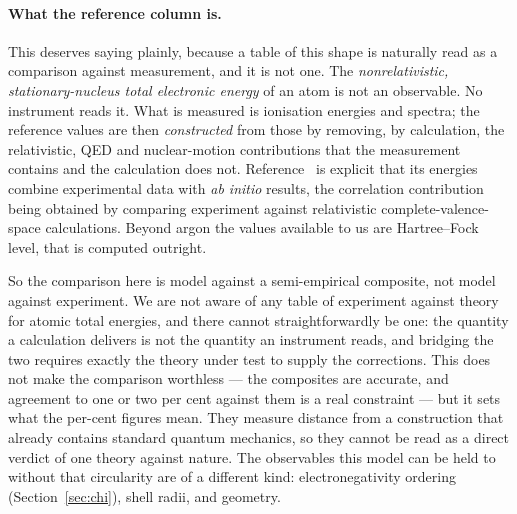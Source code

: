 \documentclass[11pt]{article}
\begin{document}
\paragraph{What the reference column is.} This deserves saying plainly, because a table of this
shape is naturally read as a comparison against measurement, and it is not one. The
\emph{nonrelativistic, stationary-nucleus total electronic energy} of an atom is not an
observable. No instrument reads it. What is measured is ionisation energies and spectra; the
reference values are then \emph{constructed} from those by removing, by calculation, the
relativistic, QED and nuclear-motion contributions that the measurement contains and the
calculation does not. Reference~\cite{Chakravorty} is explicit that its energies combine
experimental data with \emph{ab initio} results, the correlation contribution being obtained by
comparing experiment against relativistic complete-valence-space calculations. Beyond argon the
values available to us are Hartree--Fock level, that is computed outright.

So the comparison here is model against a semi-empirical composite, not model against experiment.
We are not aware of any table of experiment against theory for atomic total energies, and there
cannot straightforwardly be one: the quantity a calculation delivers is not the quantity an
instrument reads, and bridging the two requires exactly the theory under test to supply the
corrections. This does not make the comparison worthless --- the composites are accurate, and
agreement to one or two per cent against them is a real constraint --- but it sets what the
per-cent figures mean. They measure distance from a construction that already contains standard
quantum mechanics, so they cannot be read as a direct verdict of one theory against nature. The
observables this model can be held to without that circularity are of a different kind:
electronegativity ordering (Section~\ref{sec:chi}), shell radii, and geometry.
\end{document}
